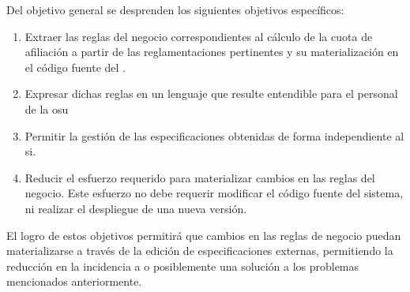 Del objetivo general se desprenden los siguientes objetivos específicos:
%
\begin{enumerate}

    \item 
    Extraer las reglas del negocio correspondientes al cálculo de la cuota de afiliación a partir de las reglamentaciones pertinentes y su materialización en el código fuente del {\SIDOSPU}.
    \item 
    \label{obj:esp:intelegible}
    Expresar dichas reglas en un lenguaje que resulte entendible para el personal de la \acrlong{osu}
    \item
    \label{obj:esp:independiente}
    Permitir la gestión de las especificaciones obtenidas de forma independiente al \acrshort{si}.
    \item Reducir el esfuerzo requerido para materializar cambios en las reglas del negocio. Este esfuerzo no debe requerir modificar el código fuente del sistema, ni realizar el despliegue de una nueva versión.
\end{enumerate}

El logro de estos objetivos permitirá que cambios en las reglas de negocio puedan materializarse a través de la edición de especificaciones externas,  permitiendo la reducción en la incidencia a o posiblemente una solución a los problemas mencionados anteriormente.

